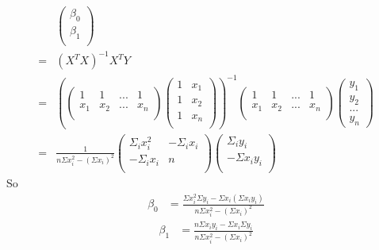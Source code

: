 \documentclass[a4paper]{article}
\begin{document}
\begin{align*}
	&\left(  \begin{array} {c}
		\beta_{0} \\
		\beta_{1} \\
		\end{array}
		\right) \\
=& (X^TX)^{-1}X^TY \\
=&\left( \left(  \begin{array} {cccc}
		1 & 1 &... &1\\
		x_1 & x_2 &... &x_n \\
		\end{array}
		\right) 
    \left(  \begin{array} {cc}
		1 & x_1 \\
		1 & x_2 \\
                   1 & x_n \\
		\end{array}
		\right) 
\right)^{-1}
\left(  \begin{array} {cccc}
		1 & 1 &... &1\\
		x_1 & x_2 &... &x_n \\
		\end{array}
		\right) 
\left(  \begin{array} {c}
		y_1 \\
		y_2 \\
                  ... \\
                  y_n
		\end{array}
		\right) \\
=& \frac{1}{n\Sigma x^2_i - (\Sigma x_i)^2}
\left(  \begin{array} {cc}
	          \Sigma_i x_i^2 & -\Sigma_i x_i \\
		 -\Sigma_i x_i &n\\
		\end{array}
		\right) 
\left(  \begin{array} {c}
	          \Sigma_i y_i \\
		 -\Sigma x_i y_i\\
		\end{array}
		\right) 
\end{align*}
So
\begin{align} \label{eq:beta0}
\beta_0 & = \frac{\Sigma x_i^2 \Sigma y_i - \Sigma x_i (\Sigma x_i y_i)}{n\Sigma x^2_i - (\Sigma x_i)^2}
\end{align}
\begin{align} \label{eq:beta1} 
\beta_1 & = \frac{n \Sigma x_i y_i -\Sigma x_i \Sigma y_i }{n\Sigma x^2_i - (\Sigma x_i)^2}
\end{align}
\end{document}
